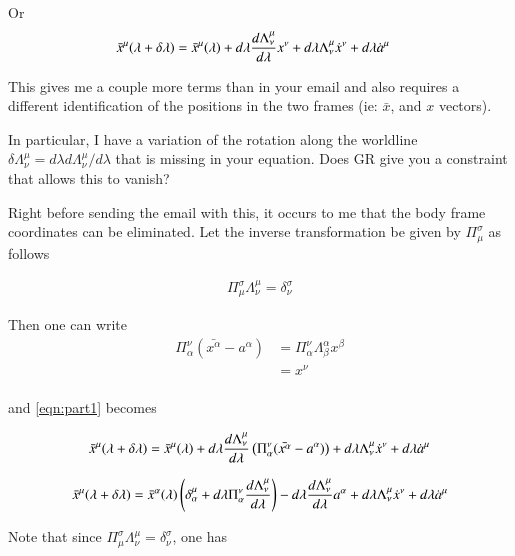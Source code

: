 Or
\begin{align}\label{eqn:part1}
\bar{x}^\mu(\lambda + \delta\lambda) 
&= \bar{x}^\mu(\lambda)
+ d\lambda \frac{d \Lambda^\mu_\nu}{d\lambda} x^\nu 
+ d\lambda \Lambda^\mu_\nu \dot{x}^\nu
+ d\lambda \dot{a}^\mu
\end{align}

This gives me a couple more terms than in your email
and also requires a different identification of the positions in the two frames (ie: $\bar{x}$, and $x$ vectors).

In particular, I have a variation of the rotation along the worldline $\delta \Lambda^\mu_\nu = d\lambda d\Lambda^\mu_\nu/d\lambda$ that is missing
in your equation.  Does GR give you a constraint that allows this to vanish?

Right before sending the email with this, it occurs to me that the body frame coordinates can be eliminated.  Let the inverse transformation be given by $\Pi^\sigma_\mu$ as follows

\begin{align*}
\Pi^\sigma_\mu \Lambda^\mu_\nu = \delta^\sigma_\nu
\end{align*}

Then one can write
\begin{align*}
\Pi^\nu_\alpha(\bar{x^\alpha} - a^\alpha)
&= \Pi^\nu_\alpha \Lambda^\alpha_\beta x^\beta  \\
&= x^\nu  \\
\end{align*}

and \ref{eqn:part1} becomes

\begin{align*}
\bar{x}^\mu(\lambda + \delta\lambda) 
&= 
\bar{x}^\mu(\lambda)
+ d\lambda \frac{d \Lambda^\mu_\nu}{d\lambda} \left( \Pi^\nu_\alpha(\bar{x^\alpha} - a^\alpha) \right)
+ d\lambda \Lambda^\mu_\nu \dot{x}^\nu
+ d\lambda \dot{a}^\mu \\
\end{align*}

\begin{align}\label{eqn:partII}
\bar{x}^\mu(\lambda + \delta\lambda) 
&= 
\bar{x}^\alpha(\lambda) \left( \delta^\mu_\alpha + d\lambda \Pi^\nu_\alpha \frac{d \Lambda^\mu_\nu}{d\lambda} \right)
- d\lambda \frac{d \Lambda^\mu_\nu}{d\lambda} a^\alpha
+ d\lambda \Lambda^\mu_\nu \dot{x}^\nu
+ d\lambda \dot{a}^\mu \\
\end{align}

Note that since $\Pi^\sigma_\mu \Lambda^\mu_\nu = \delta^\sigma_\nu$, one has

